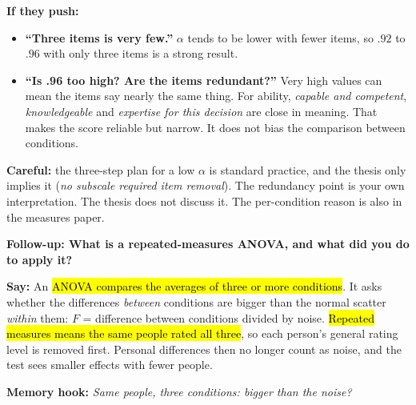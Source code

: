 \documentclass[11pt,a4paper]{article}
\newcommand{\key}[1]{\hl{#1}}
\newcommand{\hook}[1]{{\setlength{\fboxsep}{1.5pt}\colorbox{hlyellow}{\color{black}#1}}}
\newcommand{\say}[1]{\begin{tcolorbox}[colback=knlight,colframe=knblue,boxrule=0.5pt,left=6pt,right=6pt,top=4pt,bottom=4pt]\textbf{Say:} #1\end{tcolorbox}}
\newcommand{\careful}[1]{{\color{knred}\textbf{Careful:} #1}\par}
\begin{document}
\textbf{If they push:}
\begin{itemize}
  \item \textbf{``Three items is very few.''} $\alpha$ tends to be lower with fewer items, so $.92$ to $.96$ with only three items is a strong result.
  \item \textbf{``Is .96 too high? Are the items redundant?''} Very high values can mean the items say nearly the same thing. For ability, \emph{capable and competent}, \emph{knowledgeable} and \emph{expertise for this decision} are close in meaning. That makes the score reliable but narrow. It does not bias the comparison between conditions.
\end{itemize}
\careful{the three-step plan for a low $\alpha$ is standard practice, and the thesis only implies it (\emph{no subscale required item removal}). The redundancy point is your own interpretation. The thesis does not discuss it. The per-condition reason is also in the measures paper.}

{\bfseries\color{knblue}Follow-up: What is a repeated-measures ANOVA, and what did you do to apply it?}\par\vspace{0.2em}

\say{An \key{ANOVA compares the averages of three or more conditions}. It asks whether the differences \emph{between} conditions are bigger than the normal scatter \emph{within} them: $F$ = difference between conditions divided by noise. \key{Repeated measures means the same people rated all three}, so each person's general rating level is removed first. Personal differences then no longer count as noise, and the test sees smaller effects with fewer people.}

{\small\color{kngrey}\textbf{Memory hook:} \hook{\emph{Same people, three conditions: bigger than the noise?}}}
\end{document}
